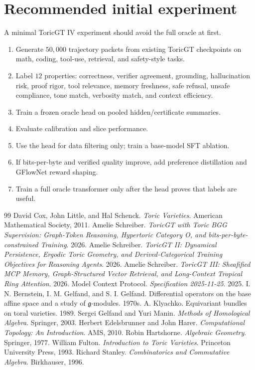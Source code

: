 \documentclass[11pt]{article}
\numberwithin{equation}{section}
\begin{document}
\section{Recommended initial experiment}
A minimal ToricGT IV experiment should avoid the full oracle at first.
\begin{enumerate}
\item Generate $50{,}000$ trajectory packets from existing ToricGT checkpoints on math, coding, tool-use, retrieval, and safety-style tasks.
\item Label $12$ properties: correctness, verifier agreement, grounding, hallucination risk, proof rigor, tool relevance, memory freshness, safe refusal, unsafe compliance, tone match, verbosity match, and context efficiency.
\item Train a frozen oracle head on pooled hidden/certificate summaries.
\item Evaluate calibration and slice performance.
\item Use the head for data filtering only; train a base-model SFT ablation.
\item If bits-per-byte and verified quality improve, add preference distillation and GFlowNet reward shaping.
\item Train a full oracle transformer only after the head proves that labels are useful.
\end{enumerate}

\begin{thebibliography}{99}
 David Cox, John Little, and Hal Schenck. \emph{Toric Varieties}. American Mathematical Society, 2011.
 Amelie Schreiber. \emph{ToricGT with Toric BGG Supervision: Graph-Token Reasoning, Hypertoric Category O, and bits-per-byte-constrained Training}. 2026.
 Amelie Schreiber. \emph{ToricGT II: Dynamical Persistence, Ergodic Toric Geometry, and Derived-Categorical Training Objectives for Reasoning Agents}. 2026.
 Amelie Schreiber. \emph{ToricGT III: Sheafified MCP Memory, Graph-Structured Vector Retrieval, and Long-Context Tropical Ring Attention}. 2026.
 Model Context Protocol. \emph{Specification 2025-11-25}. 2025.
 I. N. Bernstein, I. M. Gelfand, and S. I. Gelfand. Differential operators on the base affine space and a study of $\mathfrak{g}$-modules. 1970s.
 A. Klyachko. Equivariant bundles on toral varieties. 1989.
 Sergei Gelfand and Yuri Manin. \emph{Methods of Homological Algebra}. Springer, 2003.
 Herbert Edelsbrunner and John Harer. \emph{Computational Topology: An Introduction}. AMS, 2010.
 Robin Hartshorne. \emph{Algebraic Geometry}. Springer, 1977.
 William Fulton. \emph{Introduction to Toric Varieties}. Princeton University Press, 1993.
 Richard Stanley. \emph{Combinatorics and Commutative Algebra}. Birkhauser, 1996.
\end{thebibliography}
\end{document}

